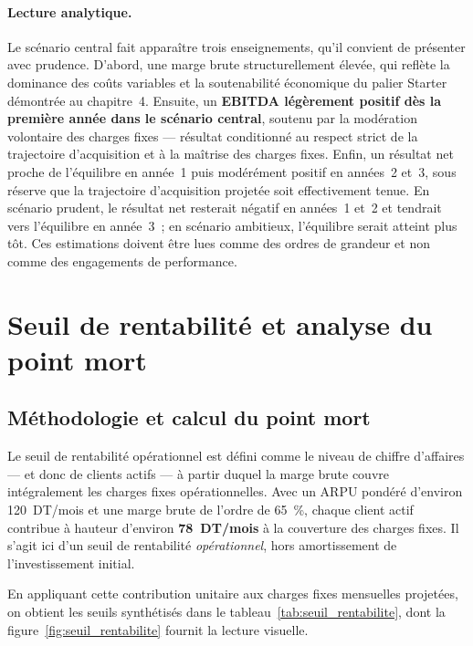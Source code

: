 \paragraph{Lecture analytique.} Le scénario central fait apparaître trois enseignements, qu'il convient de présenter avec prudence. D'abord, une marge brute structurellement élevée, qui reflète la dominance des coûts variables et la soutenabilité économique du palier Starter démontrée au chapitre~4. Ensuite, un \textbf{EBITDA légèrement positif dès la première année dans le scénario central}, soutenu par la modération volontaire des charges fixes — résultat conditionné au respect strict de la trajectoire d'acquisition et à la maîtrise des charges fixes. Enfin, un résultat net proche de l'équilibre en année~1 puis modérément positif en années~2 et~3, sous réserve que la trajectoire d'acquisition projetée soit effectivement tenue. En scénario prudent, le résultat net resterait négatif en années~1 et~2 et tendrait vers l'équilibre en année~3~; en scénario ambitieux, l'équilibre serait atteint plus tôt. Ces estimations doivent être lues comme des ordres de grandeur et non comme des engagements de performance.

\section{Seuil de rentabilité et analyse du point mort}
\label{sec:seuil_rentabilite}

\subsection{Méthodologie et calcul du point mort}
\label{subsec:methodo_seuil}

Le seuil de rentabilité opérationnel est défini comme le niveau de chiffre d'affaires — et donc de clients actifs — à partir duquel la marge brute couvre intégralement les charges fixes opérationnelles. Avec un ARPU pondéré d'environ 120~DT/mois et une marge brute de l'ordre de 65~\%, chaque client actif contribue à hauteur d'environ \textbf{78~DT/mois} à la couverture des charges fixes. Il s'agit ici d'un seuil de rentabilité \emph{opérationnel}, hors amortissement de l'investissement initial.

En appliquant cette contribution unitaire aux charges fixes mensuelles projetées, on obtient les seuils synthétisés dans le tableau~\ref{tab:seuil_rentabilite}, dont la figure~\ref{fig:seuil_rentabilite} fournit la lecture visuelle.

